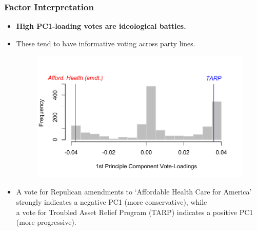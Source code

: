 \documentclass[
  shownotes,
  xcolor={svgnames},
  hyperref={colorlinks,citecolor=DarkBlue,linkcolor=DarkRed,urlcolor=DarkBlue}
  , aspectratio=169]{beamer}
\newcommand{\theme}{\color{andesred}}
\newcommand{\nv}{\color{Navy}}
\begin{document}
\begin{frame}[fragile]
\frametitle{Factor Interpretation}

\begin{itemize}
  \item {\bf \nv High PC1-loading votes are \theme  ideological battles.} 
  \item These tend to have  informative voting across party lines.


 \begin{figure}[H] \centering
            \captionsetup{justification=centering}
              \includegraphics[scale=.5]{figures/VOTEloads}
 \end{figure}


 \footnotesize 
\item A vote for Repulican amendments to `Affordable Health Care for America' strongly indicates a negative PC1 (more conservative), while \\a vote for Troubled Asset Relief Program (TARP) indicates a positive PC1 (more progressive).
\end{itemize}

\end{frame}
\end{document}
